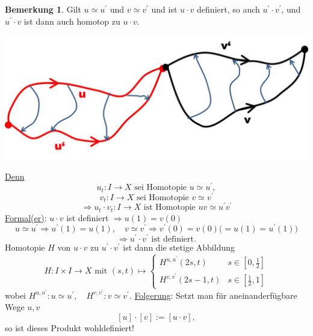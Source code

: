 \documentclass[a4paper,11pt,notitlepage]{report}
\theoremstyle{definition}
\newtheorem{remark}{Bemerkung}[chapter]
\begin{document}
\begin{remark}{}
	Gilt $u \simeq u^\prime$ und $v \simeq v^\prime$ und ist $u \cdot v$ definiert, so auch $u^\prime \cdot v^\prime$, und $u^\prime \cdot v$ ist dann auch homotop zu $u \cdot v$.
	\begin{center}
	\includegraphics[scale=0.4]{images/Homotopie_Produkt.jpg}
	\end{center}
	\underline{Denn}
	$$u_t \colon I \rightarrow X \text{ sei Homotopie } u \simeq u^\prime,$$
	$$v_t \colon I \rightarrow X \text{ sei Homotopie } v \simeq v^\prime$$
	$$\Rightarrow u_t \cdot v_t \colon I \rightarrow X \text{ ist Homotopie } uv \simeq u^\prime v^\prime$$
	\underline{Formal(er)}: $u \cdot v$ ist definiert $\Rightarrow u(1) = v(0)$
	$$u \simeq u^\prime \Rightarrow u^\prime(1)=u(1), \quad v \simeq v^\prime \Rightarrow v^\prime(0) = v(0)  \big(=u(1)=u^\prime(1)\big)$$
	$$\Rightarrow u^\prime \cdot v^\prime \text{ ist definiert.}$$
	Homotopie $H$ von $u \cdot v$ zu $u^\prime \cdot v^\prime$ ist dann die stetige Abbildung
	$$H \colon I \times I \rightarrow X \text{ mit } (s,t) \mapsto \begin{cases} H^{u,u^\prime}(2s,t) & s \in [0,\frac{1}{2}] \\ H^{v,v^\prime}(2s-1,t) & s \in [\frac{1}{2},1] \end{cases}$$
	wobei $H^{u,u^\prime} \colon u \simeq u^\prime, \quad H^{v,v^\prime} \colon v \simeq v^\prime$.
	\newline
	\underline{Folgerung}: Setzt man für aneinanderfügbare Wege $u,v$
	$$[u] \cdot [v] := [u \cdot v],$$
	so ist dieses Produkt wohldefiniert!
\end{remark}
\end{document}
